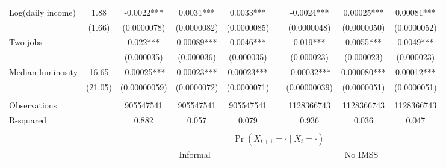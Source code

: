 \begin{tabular}{lclllrlll}
Log(daily income) & 1.88  & \multicolumn{1}{c}{-0.0022***} & \multicolumn{1}{c}{0.0031***} & \multicolumn{1}{c}{0.0033***} &       & \multicolumn{1}{c}{-0.0024***} & \multicolumn{1}{c}{0.00025***} & \multicolumn{1}{c}{0.00081***} \\
      & (1.66) & \multicolumn{1}{c}{(0.0000078)} & \multicolumn{1}{c}{(0.0000082)} & \multicolumn{1}{c}{(0.0000085)} &       & \multicolumn{1}{c}{(0.0000048)} & \multicolumn{1}{c}{(0.0000050)} & \multicolumn{1}{c}{(0.0000052)} \\
Two jobs &       & \multicolumn{1}{c}{0.022***} & \multicolumn{1}{c}{0.00089***} & \multicolumn{1}{c}{0.0046***} &       & \multicolumn{1}{c}{0.019***} & \multicolumn{1}{c}{0.0055***} & \multicolumn{1}{c}{0.0049***} \\
      &       & \multicolumn{1}{c}{(0.000035)} & \multicolumn{1}{c}{(0.000036)} & \multicolumn{1}{c}{(0.000035)} &       & \multicolumn{1}{c}{(0.000023)} & \multicolumn{1}{c}{(0.000023)} & \multicolumn{1}{c}{(0.000023)} \\
Median luminosity & 16.65 & \multicolumn{1}{c}{-0.00025***} & \multicolumn{1}{c}{0.00023***} & \multicolumn{1}{c}{0.00023***} &       & \multicolumn{1}{c}{-0.00032***} & \multicolumn{1}{c}{0.000080***} & \multicolumn{1}{c}{0.00012***} \\
      & (21.05) & \multicolumn{1}{c}{(0.00000059)} & \multicolumn{1}{c}{(0.0000072)} & \multicolumn{1}{c}{(0.0000071)} &       & \multicolumn{1}{c}{(0.00000039)} & \multicolumn{1}{c}{(0.0000051)} & \multicolumn{1}{c}{(0.0000051)} \\
      &       &       &       &       &       &       &       &  \\
\midrule
Observations &       & \multicolumn{1}{c}{905547541} & \multicolumn{1}{c}{905547541} & \multicolumn{1}{c}{905547541} &       & \multicolumn{1}{c}{1128366743} & \multicolumn{1}{c}{1128366743} & \multicolumn{1}{c}{1128366743} \\
R-squared &       & \multicolumn{1}{c}{0.882} & \multicolumn{1}{c}{0.057} & \multicolumn{1}{c}{0.079} &       & \multicolumn{1}{c}{0.936} & \multicolumn{1}{c}{0.036} & \multicolumn{1}{c}{0.047} \\
\midrule
\midrule
      &       &       &       &       &       &       &       &  \\
\midrule
      &       & \multicolumn{7}{c}{$\Pr(X_{t+1} = \cdot \;|\; X_{t} = \cdot)$} \\
\midrule
      &       & \multicolumn{3}{c}{Informal  } &       & \multicolumn{3}{c}{No IMSS} \\

\end{tabular}
